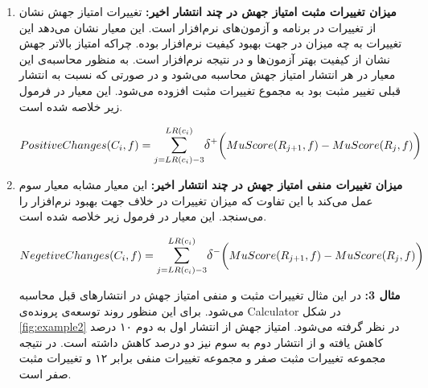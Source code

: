 \begin{enumerate}
	\item 
	\textbf{
		میزان تغییرات مثبت امتیاز جهش  در چند انتشار اخیر:}
	تغییرات امتیاز جهش نشان از تغییرات در برنامه و آزمون‌های نرم‌افزار است. این معیار نشان می‌دهد این تغییرات به چه میزان در جهت بهبود کیفیت نرم‌افزار بوده. چراکه امتیاز بالاتر جهش نشان از کیفیت بهتر آزمون‌ها و در نتیجه نرم‌افزار است.  به منظور محاسبه‌ی این معیار در هر انتشار امتیاز جهش محاسبه می‌شود و در صورتی که نسبت به انتشار قبلی تغییر مثبت  بود به مجموع تغییرات  مثبت  افزوده می‌شود. این معیار در فرمول زیر خلاصه شده است.
\begin{latin}
\[
PositiveChanges(C_i,f) = \mathlarger{\sum}\limits_{j=LR(c_i)-3}^{LR(c_i)} 
\mathlarger{\delta}^+\bigg(MuScore(R_{j+1},f) - MuScore(R_j,f)\bigg) 
\]
\end{latin}	


	\item 
	\textbf{
		میزان تغییرات منفی امتیاز جهش در چند انتشار اخیر:}
	این معیار مشابه معیار سوم عمل می‌کند با این تفاوت که میزان تغییرات در خلاف جهت بهبود نرم‌افزار را می‌سنجد. این معیار در فرمول زیر خلاصه شده است.
\begin{latin}
	\[
	NegetiveChanges(C_i,f) = \mathlarger{\sum}\limits_{j=LR(c_i)-3}^{LR(c_i)} 
	\mathlarger{\delta}^-\bigg(MuScore(R_{j+1},f) - MuScore(R_j,f)\bigg) 
	\]
\end{latin}	
\textbf{مثال 3:}
در این مثال تغییرات مثبت و منفی امتیاز جهش در انتشارهای قبل محاسبه می‌شود. برای این منظور روند توسعه‌ی پرونده‌ی Calculator در شکل \ref{fig:example2}  در نظر گرفته می‌شود. امتیاز جهش از انتشار اول به دوم ۱۰ درصد کاهش یافته و از انتشار دوم به سوم نیز دو درصد کاهش داشته است. در نتیجه مجموعه تغییرات مثبت صفر و مجموعه تغییرات منفی برابر ۱۲ و تغییرات مثبت صفر است. 
	
\end{enumerate}


